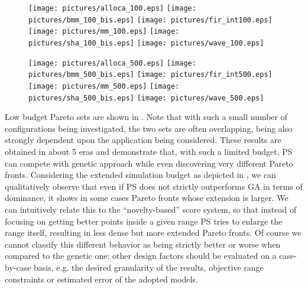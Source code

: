 \begin{figure}
  \begin{center}
    \texttt{[image: pictures/alloca\_100.eps]}
    \texttt{[image: pictures/bmm\_100\_bis.eps]}
    \texttt{[image: pictures/fir\_int100.eps]}
    \texttt{[image: pictures/mm\_100.eps]}
    \texttt{[image: pictures/sha\_100\_bis.eps]}
    \texttt{[image: pictures/wave\_100.eps]} 
  \end{center}
\end{figure}

\begin{figure}
  \begin{center}
    \texttt{[image: pictures/alloca\_500.eps]}
    \texttt{[image: pictures/bmm\_500\_bis.eps]}
    \texttt{[image: pictures/fir\_int500.eps]}
    \texttt{[image: pictures/mm\_500.eps]}
    \texttt{[image: pictures/sha\_500\_bis.eps]}
    \texttt{[image: pictures/wave\_500.eps]} 
  \end{center}
\end{figure}

Low budget Pareto sets are shown in . Note
that with such a small number of configurations being investigated, the
two sets are often overlapping, being also strongly dependent upon the
application being considered.  These results are obtained in about 5
eras and demonstrate that, with such a limited budget, PS can compete with
genetic approach while even discovering very different Pareto fronts.
Considering the extended simulation budget as depicted in
, we can qualitatively observe that even if PS
does not strictly outperforms GA in terms of dominance, it shows
in some cases Pareto fronts whose extension is larger. We can intuitively
relate this to the ``novelty-based'' score system, so that instead of
focusing on getting better points inside a given range PS tries to
enlarge the range itself, resulting in less dense but more extended
Pareto fronts. Of course we cannot classify this different behavior as
being strictly better or worse when compared to the genetic one: other
design factors should be evaluated on a case-by-case basis, e.g. the
desired granularity of the results, objective range constraints or
estimated error of the adopted models.

